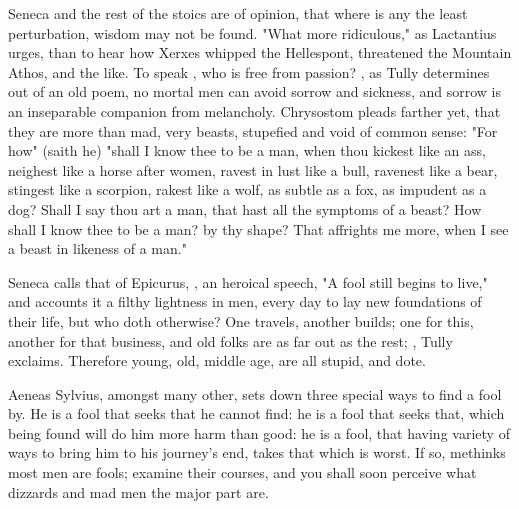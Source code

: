 
Seneca and the rest of the stoics are of opinion, that where is any the least
perturbation, wisdom may not be found. "What more ridiculous," as
Lactantius urges, than to hear how Xerxes whipped the
Hellespont, threatened the Mountain Athos, and the like. To speak ,
who is free from passion? , as Tully determines out of an
old poem, no mortal men can avoid sorrow and sickness, and sorrow is an
inseparable companion from melancholy. Chrysostom pleads
farther yet, that they are more than mad, very beasts, stupefied and void of
common sense: "For how" (saith he) "shall I know thee to be a man, when thou
kickest like an ass, neighest like a horse after women, ravest in lust like a
bull, ravenest like a bear, stingest like a scorpion, rakest like a wolf, as
subtle as a fox, as impudent as a dog? Shall I say thou art a man, that hast
all the symptoms of a beast? How shall I know thee to be a man? by thy shape?
That affrights me more, when I see a beast in likeness of a man."

Seneca calls that of Epicurus, , an
heroical speech, "A fool still begins to live," and accounts it a filthy
lightness in men, every day to lay new foundations of their life, but who doth
otherwise? One travels, another builds; one for this, another for that
business, and old folks are as far out as the rest; ,
Tully exclaims. Therefore young, old, middle age, are all stupid, and dote.

Aeneas Sylvius, amongst many other, sets down three special
ways to find a fool by. He is a fool that seeks that he cannot find: he is a
fool that seeks that, which being found will do him more harm than good: he is
a fool, that having variety of ways to bring him to his journey's end, takes
that which is worst. If so, methinks most men are fools; examine their courses,
and you shall soon perceive what dizzards and mad men the major part are.

